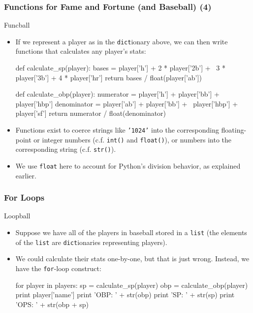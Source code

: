 \documentclass[10pt]{beamer}
\begin{document}
\begin{frame}[fragile]
  \frametitle{Functions for Fame and Fortune (and Baseball) (4)}
  \begin{block}{Funcball}
    \begin{itemize}
      \item If we represent a player as in the \texttt{dict}ionary above, we can then write functions that calculates any player's stats:
        \footnotesize
        \begin{pythoncode}
  def calculate_sp(player):
    bases = player['h'] + 2 * player['2b'] + \
      3 * player['3b'] + 4 * player['hr']
    return bases / float(player['ab'])

  def calculate_obp(player):
    numerator = player['h'] + player['bb'] + player['hbp']
    denominator = player['ab'] + player['bb'] + \
      player['hbp'] + player['sf']
    return numerator / float(denominator)
        \end{pythoncode}
        \normalsize
      \item Functions exist to coerce strings like \texttt{'1024'} into the corresponding floating-point or integer numbers (c.f. \texttt{int()} and \texttt{float()}), or numbers into the corresponding string (c.f. \texttt{str()}).
      \item We use \texttt{float} here to account for Python's division behavior, as explained earlier.
    \end{itemize}
  \end{block}
\end{frame}

\begin{frame}[fragile]
  \frametitle{For Loops}
  \begin{block}{Loopball}
    \begin{itemize}
      \item Suppose we have all of the players in baseball stored in a \texttt{list} (the elements of the \texttt{list} are \texttt{dict}ionaries representing players).
      \item We could calculate their stats one-by-one, but that is just wrong.
        Instead, we have the \texttt{for}-loop construct:
        \begin{pythoncode}
  for player in players:
    sp = calculate_sp(player)
    obp = calculate_obp(player)
    print player['name']
    print 'OBP: ' + str(obp)
    print 'SP: ' + str(sp)
    print 'OPS: ' + str(obp + sp)
        \end{pythoncode}
    \end{itemize}
  \end{block}
\end{frame}
\end{document}

